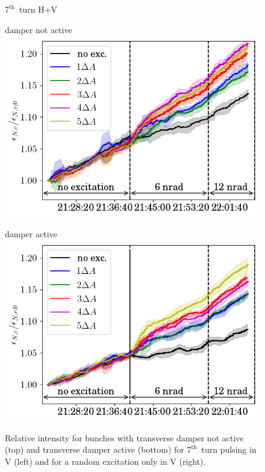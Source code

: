 \documentclass[%
 reprint,
 amsmath,amssymb,
 aps,
prstab,
]{revtex4-1}
\begin{document}
\begin{figure}[b]
	$7^{\mathrm{th}}$~turn H+V\\
	\begin{minipage}[t]{0.49\linewidth}
		\centering
		damper not active
		\includegraphics[width=1.0\linewidth]{2017_emitv_avg_rel_v7th_no_damper_no_text.png}
	\end{minipage}	
	\begin{minipage}[t]{0.49\linewidth}
		\centering
		damper active
		\includegraphics[width=1.0\linewidth]{2017_emitv_avg_rel_v7th_with_damper_no_text.png}
	\end{minipage}	
	\caption{\label{fig:damp} Relative intensity for bunches with transverse damper not active (top) and transverse damper active (bottom) for $7^{\mathrm{th}}$~turn pulsing in V (left) and for a random excitation only in V (right).}
\end{figure}
\end{document}
